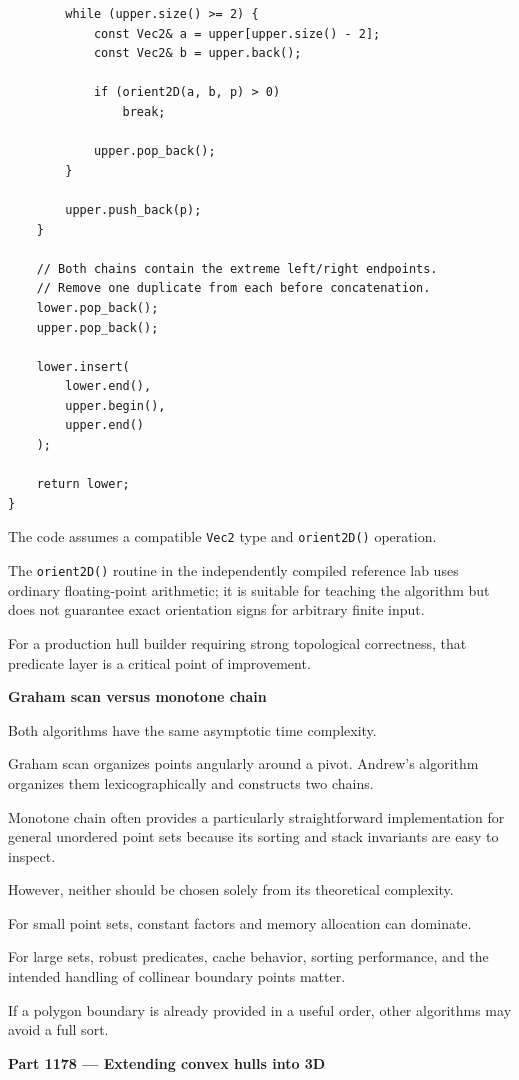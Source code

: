 \begin{verbatim}
        while (upper.size() >= 2) {
            const Vec2& a = upper[upper.size() - 2];
            const Vec2& b = upper.back();

            if (orient2D(a, b, p) > 0)
                break;

            upper.pop_back();
        }

        upper.push_back(p);
    }

    // Both chains contain the extreme left/right endpoints.
    // Remove one duplicate from each before concatenation.
    lower.pop_back();
    upper.pop_back();

    lower.insert(
        lower.end(),
        upper.begin(),
        upper.end()
    );

    return lower;
}
\end{verbatim}

The code assumes a compatible \texttt{Vec2} type and \texttt{orient2D()} operation.

The \texttt{orient2D()} routine in the independently compiled reference lab uses ordinary floating-point arithmetic; it is suitable for teaching the algorithm but does not guarantee exact orientation signs for arbitrary finite input.

For a production hull builder requiring strong topological correctness, that predicate layer is a critical point of improvement.

\textbf{Graham scan versus monotone chain}

Both algorithms have the same asymptotic time complexity.

Graham scan organizes points angularly around a pivot. Andrew's algorithm organizes them lexicographically and constructs two chains.

Monotone chain often provides a particularly straightforward implementation for general unordered point sets because its sorting and stack invariants are easy to inspect.

However, neither should be chosen solely from its theoretical complexity.

For small point sets, constant factors and memory allocation can dominate.

For large sets, robust predicates, cache behavior, sorting performance, and the intended handling of collinear boundary points matter.

If a polygon boundary is already provided in a useful order, other algorithms may avoid a full sort.

\textbf{Part 1178 --- Extending convex hulls into 3D}

